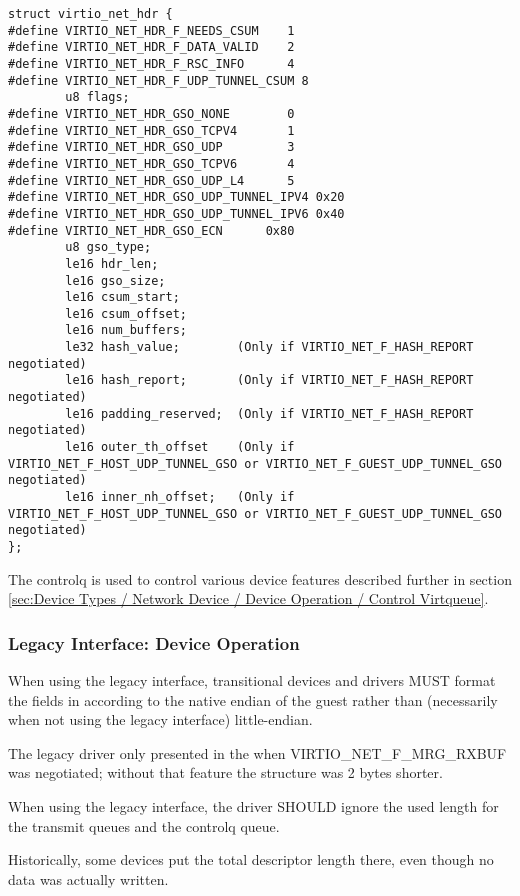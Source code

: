 \begin{lstlisting}
struct virtio_net_hdr {
#define VIRTIO_NET_HDR_F_NEEDS_CSUM    1
#define VIRTIO_NET_HDR_F_DATA_VALID    2
#define VIRTIO_NET_HDR_F_RSC_INFO      4
#define VIRTIO_NET_HDR_F_UDP_TUNNEL_CSUM 8
        u8 flags;
#define VIRTIO_NET_HDR_GSO_NONE        0
#define VIRTIO_NET_HDR_GSO_TCPV4       1
#define VIRTIO_NET_HDR_GSO_UDP         3
#define VIRTIO_NET_HDR_GSO_TCPV6       4
#define VIRTIO_NET_HDR_GSO_UDP_L4      5
#define VIRTIO_NET_HDR_GSO_UDP_TUNNEL_IPV4 0x20
#define VIRTIO_NET_HDR_GSO_UDP_TUNNEL_IPV6 0x40
#define VIRTIO_NET_HDR_GSO_ECN      0x80
        u8 gso_type;
        le16 hdr_len;
        le16 gso_size;
        le16 csum_start;
        le16 csum_offset;
        le16 num_buffers;
        le32 hash_value;        (Only if VIRTIO_NET_F_HASH_REPORT negotiated)
        le16 hash_report;       (Only if VIRTIO_NET_F_HASH_REPORT negotiated)
        le16 padding_reserved;  (Only if VIRTIO_NET_F_HASH_REPORT negotiated)
        le16 outer_th_offset    (Only if VIRTIO_NET_F_HOST_UDP_TUNNEL_GSO or VIRTIO_NET_F_GUEST_UDP_TUNNEL_GSO negotiated)
        le16 inner_nh_offset;   (Only if VIRTIO_NET_F_HOST_UDP_TUNNEL_GSO or VIRTIO_NET_F_GUEST_UDP_TUNNEL_GSO negotiated)
};
\end{lstlisting}

The controlq is used to control various device features described further in
section \ref{sec:Device Types / Network Device / Device Operation / Control Virtqueue}.

\subsubsection{Legacy Interface: Device Operation}\label{sec:Device Types / Network Device / Device Operation / Legacy Interface: Device Operation}
When using the legacy interface, transitional devices and drivers
MUST format the fields in 
according to the native endian of the guest rather than
(necessarily when not using the legacy interface) little-endian.

The legacy driver only presented  in the 
when VIRTIO_NET_F_MRG_RXBUF was negotiated; without that feature the
structure was 2 bytes shorter.

When using the legacy interface, the driver SHOULD ignore the
used length for the transmit queues
and the controlq queue.
\begin{note}
Historically, some devices put
the total descriptor length there, even though no data was
actually written.
\end{note}

